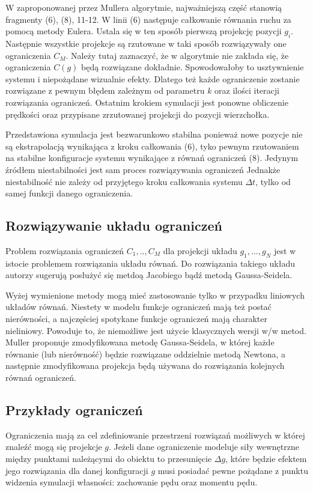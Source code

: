 W zaproponowanej przez Mullera algorytmie, najważniejszą część stanowią
fragmenty (6), (8), 11-12. W linii (6) następuje całkowanie równania ruchu za 
pomocą metody Eulera. Ustala się w ten sposób pierwszą projekcję pozycji $g_i$. Następnie
wszystkie projekcje są rzutowane w taki sposób rozwiązywały one
ograniczenia $C_M$. Należy tutaj zaznaczyć, że w algorytmie nie zakłada się, że
ograniczenia $C(g)$ będą rozwiązane dokładnie. Spowodowałoby to 
usztywnienie systemu i niepożądane wizualnie efekty. Dlatego też każde
ograniczenie zostanie rozwiązane z pewnym błędem zależnym od parametru $k$ oraz
ilości iteracji rozwiązania ograniczeń.
Ostatnim krokiem symulacji jest ponowne obliczenie
prędkości oraz przypisane zrzutowanej projekcji do pozycji wierzchołka.

Przedstawiona symulacja jest bezwarunkowo stabilna \cite{pbdyn} ponieważ nowe pozycje nie są
ekstrapolacją wynikająca z kroku całkowania (6), tyko pewnym rzutowaniem na
stabilne konfiguracje systemu wynikające z równań ograniczeń (8). Jedynym
źródłem niestabilności jest sam proces rozwiązywania ograniczeń \cite{pbdyn}
Jednakże niestabilność nie zależy od przyjętego kroku całkowania systemu $\Delta
t$, tylko od samej funkcji danego ograniczenia\cite{pbdyn}.

\subsection{Rozwiązywanie układu ograniczeń}
Problem rozwiązania ograniczeń $C_1, .., C_M$ dla projekcji układu $g_1, ..., g_N$
jest w istocie problemem rozwiązania układu równań. Do rozwiązania takiego
układu autorzy sugerują posłużyć się metdoą Jacobiego bądź metodą Gaussa-Seidela. 

Wyżej wymienione metody mogą mieć zastosowanie tylko w przypadku
liniowych układów równań. Niestety w modelu funkcje ograniczeń mają też postać nierówności, a
najczęściej spotykane funkcje ograniczeń mają charakter nieliniowy. Powoduje to,
że niemożliwe jest użycie klasycznych wersji w/w metod. Muller proponuje
zmodyfikowana metodę Gaussa-Seidela, w której każde równanie (lub nierówność) będzie rozwiązane
oddzielnie metodą Newtona, a następnie zmodyfikowana projekcja będą używana do
rozwiązania kolejnych równań ograniczeń.

\subsection{Przykłady ograniczeń}
Ograniczenia mają za cel zdefiniowanie przestrzeni rozwiązań możliwych w której
znaleźć mogą się projekcje $g$.  Jeżeli dane ograniczenie modeluje siły
wewnętrzne między punktami należącymi do obiektu to przesunięcie $\Delta g$,
	które będzie efektem jego rozwiązania dla danej konfiguracji $g$ musi
	posiadać pewne pożądane z punktu widzenia symulacji własności: zachowanie
	pędu oraz momentu pędu.

